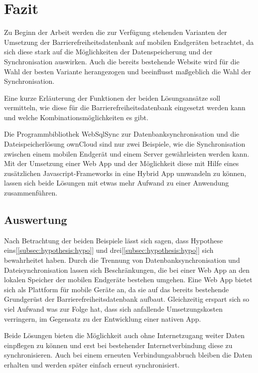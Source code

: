 %
\chapter{Fazit}
\label{sec:Fazit}

Zu Beginn der Arbeit werden die zur Verfügung stehenden Varianten der Umsetzung der Barrierefreiheitsdatenbank auf mobilen Endgeräten betrachtet, da sich diese stark auf die Möglichkeiten der Datenspeicherung und der Synchronisation auswirken. Auch die bereits bestehende Website wird für die Wahl der besten Variante herangezogen und beeinflusst maßgeblich die Wahl der Synchronisation.

Eine kurze Erläuterung der Funktionen der beiden Lösungsansätze soll vermitteln, wie diese für die Barrierefreiheitsdatenbank eingesetzt werden kann und welche Kombinationsmöglichkeiten es gibt.

Die Programmbibliothek WebSqlSync zur Datenbanksynchronisation und die Dateispeicherlösung ownCloud sind nur zwei Beispiele, wie die Synchronisation zwischen einem mobilen Endgerät und einem Server gewährleisten werden kann. Mit der Umsetzung einer Web App und der Möglichkeit diese mit Hilfe eines zusätzlichen Javascript-Frameworks in eine Hybrid App umwandeln zu können, lassen sich beide Lösungen mit etwas mehr Aufwand zu einer Anwendung zusammenführen.

\section{Auswertung}
\label{sec:Fazit:Auswertung}

Nach Betrachtung der beiden Beispiele lässt sich sagen, dass Hypothese eins[\ref{subsec:hypothesis:hypo}] und drei[\ref{subsec:hypothesis:hypo}] sich bewahrheitet haben. Durch die Trennung von Datenbanksynchronisation und Dateisynchronisation lassen sich Beschränkungen, die bei einer Web App an den lokalen Speicher der mobilen Endgeräte bestehen umgehen. Eine Web App bietet sich als Plattform für mobile Geräte an, da sie auf das bereits bestehende Grundgerüst der Barrierefreiheitsdatenbank aufbaut. Gleichzeitig erspart sich so viel Aufwand was zur Folge hat, dass sich anfallende Umsetzungskosten verringern, im Gegensatz zu der Entwicklung einer nativen App.

Beide Lösungen bieten die Möglichkeit auch ohne Internetzugang weiter Daten einpflegen zu können und erst bei bestehender Internetverbindung diese zu synchronisieren. Auch bei einem erneuten Verbindungsabbruch bleiben die Daten erhalten und werden später einfach erneut synchronisiert.

